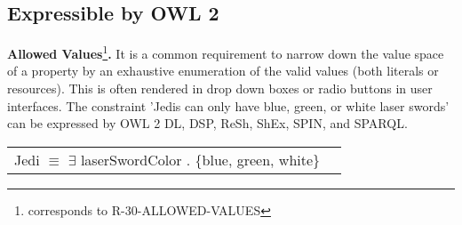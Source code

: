 \documentclass{llncs}
\newcommand{\ms}[1]{\texttt{#1}}
\newenvironment{DL}{
  \vspace{0cm}
  \begin{tabular}{r l}

}{
  \end{tabular}
}
\begin{document}
\subsection{Expressible by OWL 2}
\label{sec:RDF-validation-requirements-without-reasoning-2}

%
%
%

\textbf{Allowed Values}\footnote{corresponds to R-30-ALLOWED-VALUES}\textbf{.}
It is a common requirement to narrow down the value space of a property by an exhaustive enumeration of the valid values (both literals or resources). This is often rendered in drop down boxes or radio buttons in user interfaces. 
The constraint 'Jedis can only have blue, green, or white laser swords' can be expressed by OWL 2 DL, DSP, ReSh, ShEx, SPIN, and SPARQL.
\begin{center}
\begin{DL}
Jedi $\equiv$ $\exists$ laserSwordColor . \{blue, green, white\} \\
\end{DL}
\end{center}
%
\end{document}
